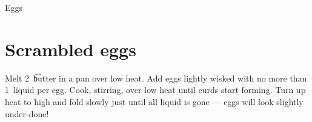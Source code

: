 
\begin{recipe}{Eggs}%

\section{Scrambled eggs}
Melt 2~\t butter in a pan over low heat. Add eggs lightly wisked with no
more than 1~\T liquid per egg. Cook, stirring, over low heat until curds
start forming. Turn up heat to high and fold slowly just until all liquid
is gone --- eggs will look slightly under-done!


\end{recipe}

